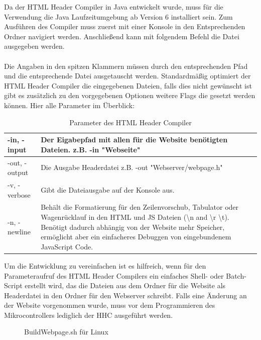 Da der HTML Header Compiler in Java entwickelt wurde, muss für die Verwendung die
Java Laufzeitumgebung ab Version 6 installiert sein. Zum Ausführen des Compiler
muss zuerst mit einer Konsole in den Entsprechenden Ordner navigiert werden.
Anschließend kann mit folgendem Befehl die Datei ausgegeben werden. 
\\

\\

Die Angaben in den spitzen Klammern müssen durch den entsprechenden Pfad und
die entsprechende Datei ausgetauscht werden. Standardmäßig optimiert der
HTML Header Compiler die eingegebenen Dateien, falls dies nicht gewünscht ist
gibt es zusätzlich zu den vorgegebenen Optionen weitere Flags
die gesetzt werden können. Hier alle Parameter im Überblick:

\begin{table}[H]
\begin{tabular}{| p{} | p{} |}
\hline
-in, -input & Der Eigabepfad mit allen für die Website benötigten Dateien. z.B. \textrm{-in "Webseite"} \\ \hline 
-out, -output & Die Ausgabe Headerdatei z.B. \textrm{-out "Webserver/webpage.h"} \\ \hline
-v, -verbose &  Gibt die Dateiausgabe auf der Konsole aus.
\\
 \hline 
 -n, -newline & Behält die Formatierung für den Zeilenvorschub, Tabulator
 oder Wagenrücklauf in den HTML und JS Dateien (\textbackslash n and
 \textbackslash r \textbackslash t).
 Benötigt dadurch abhängig von der Website mehr Speicher, ermöglicht aber ein
 einfacheres Debuggen von eingebundenem JavaScript Code.  \\ \hline
\end{tabular}
\caption{Parameter des HTML Header Compiler}
\label{parameterHHC}
\end{table}

Um die Entwicklung zu vereinfachen ist es hilfreich, wenn für den Parameteraufruf
des HTML Header Compilers ein einfaches Shell- oder Batch-Script erstellt wird,
das die Dateien aus dem Ordner für die Website als Headerdatei in den Ordner für den
Webserver schreibt. Falls eine Änderung an der Website vorgenommen wurde, muss
vor dem Programmieren des Mikrocontrollers lediglich der \ac{HHC} ausgeführt
werden.

\begin{figure}[H]

\caption{BuildWebpage.sh für Linux}
\label{output}
\end{figure}


